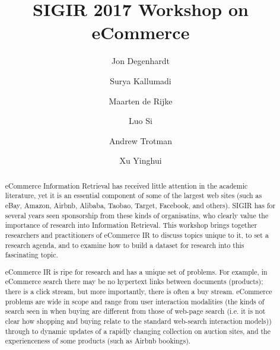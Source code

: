 \documentclass[sigconf]{acmart}
\begin{document}
\title{SIGIR 2017 Workshop on eCommerce}

\author{Jon Degenhardt}


\author{Surya Kallumadi}

\author{Maarten de Rijke}


\author{Luo Si}

\author{Andrew Trotman}

\author{Xu Yinghui}

\renewcommand{\shortauthors}{J. Degenhardt et al.}


\begin{abstract}
eCommerce Information Retrieval has received little attention in the
academic literature, yet it is an essential component of some of the
largest web sites (such as eBay, Amazon, Airbnb,  Alibaba, Taobao, Target, Facebook, and others).  SIGIR has for
several years seen sponsorship from these kinds of organisatins, who clearly value the
importance of research into Information Retrieval.  This
workshop  brings together researchers and practitioners of
eCommerce IR to discuss topics unique to it, to set a research agenda,
and to examine how to build a dataset for research into this fascinating topic.

eCommerce IR is ripe for research and has a unique
set of problems.  For example, in eCommerce search there may be no hypertext links
between documents (products); there is a click stream, but more importantly, there
is often a buy stream.  eCommerce problems are wide in scope and range from user interaction
modalities (the kinds of search seen in when buying are different from those
of web-page search (i.e. it is not clear how shopping and buying relate to the standard
web-search interaction models)) through to dynamic updates of a rapidly
changing collection on auction sites, and the experienceness of some products (such as Airbnb bookings).
\end{abstract}

%
%
\end{document}
